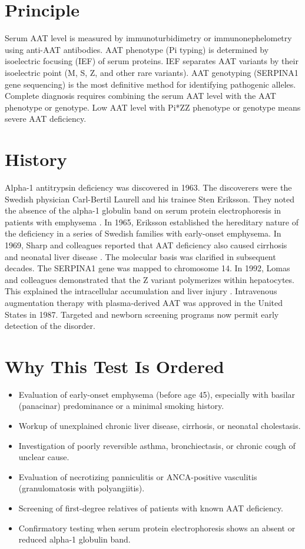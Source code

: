 \section*{Principle}
Serum AAT level is measured by immunoturbidimetry or immunonephelometry using anti-AAT antibodies. AAT phenotype (Pi typing) is determined by isoelectric focusing (IEF) of serum proteins. IEF separates AAT variants by their isoelectric point (M, S, Z, and other rare variants). AAT genotyping (SERPINA1 gene sequencing) is the most definitive method for identifying pathogenic alleles. Complete diagnosis requires combining the serum AAT level with the AAT phenotype or genotype. Low AAT level with Pi*ZZ phenotype or genotype means severe AAT deficiency.
\section*{History}
Alpha-1 antitrypsin deficiency was discovered in 1963. The discoverers were the Swedish physician Carl-Bertil Laurell and his trainee Sten Eriksson. They noted the absence of the alpha-1 globulin band on serum protein electrophoresis in patients with emphysema \cite{laurell1963electrophoretic}. In 1965, Eriksson established the hereditary nature of the deficiency in a series of Swedish families with early-onset emphysema. In 1969, Sharp and colleagues reported that AAT deficiency also caused cirrhosis and neonatal liver disease \cite{sharp1969cirrhosis}. The molecular basis was clarified in subsequent decades. The SERPINA1 gene was mapped to chromosome 14. In 1992, Lomas and colleagues demonstrated that the Z variant polymerizes within hepatocytes. This explained the intracellular accumulation and liver injury \cite{lomas1992mechanism}. Intravenous augmentation therapy with plasma-derived AAT was approved in the United States in 1987. Targeted and newborn screening programs now permit early detection of the disorder.
\section*{Why This Test Is Ordered}
\begin{itemize}
  \item Evaluation of early-onset emphysema (before age 45), especially with basilar (panacinar) predominance or a minimal smoking history.
  \item Workup of unexplained chronic liver disease, cirrhosis, or neonatal cholestasis.
  \item Investigation of poorly reversible asthma, bronchiectasis, or chronic cough of unclear cause.
  \item Evaluation of necrotizing panniculitis or ANCA-positive vasculitis (granulomatosis with polyangiitis).
  \item Screening of first-degree relatives of patients with known AAT deficiency.
  \item Confirmatory testing when serum protein electrophoresis shows an absent or reduced alpha-1 globulin band.
\end{itemize}
